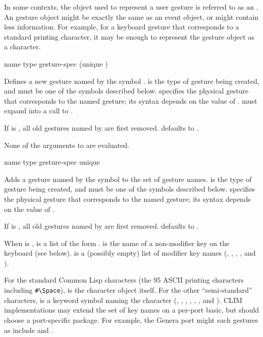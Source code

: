 In some contexts, the object used to represent a user gesture is referred to as
an .  An gesture object might be exactly the same as an
event object, or might contain less information.  For example, for a keyboard
gesture that corresponds to a standard printing character, it may be enough to
represent the gesture object as a character.


 {name type gesture-spec \key (unique )}

Defines a new gesture named by the symbol .   is the type of
gesture being created, and must be one of the symbols described below.
 specifies the physical gesture that corresponds to the named
gesture; its syntax depends on the value of .
 must expand into a call to .

If  is , all old gestures named by  are first
removed.   defaults to .

None of the arguments to  are evaluated.

 {name type gesture-spec \key unique}

Adds a gesture named by the symbol  to the set of gesture names.
 is the type of gesture being created, and must be one of the symbols
described below.   specifies the physical gesture that
corresponds to the named gesture; its syntax depends on the value of .

If  is , all old gestures named by  are first
removed.   defaults to .

When  is ,  is a list of the form
.   is the name of a
non-modifier key on the keyboard (see below).   is a
(possibly empty) list of modifier key names (, ,
, , and ).

For the standard Common Lisp characters (the 95 ASCII printing characters
including \verb+#\Space+),  is the character object itself.  For
the other ``semi-standard'' characters,  is a keyword symbol
naming the character (, , , ,
, , and ).  CLIM implementations may extend
the set of key names on a per-port basic, but should choose a port-specific
package.  For example, the Genera port might such gestures as include
 and .

